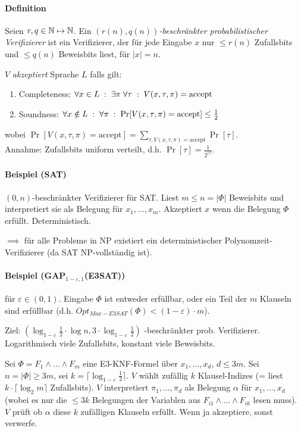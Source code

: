 \paragraph{Definition}
Seien $r, q \in \mathbb{N} \mapsto \mathbb{N}$.
Ein \emph{$(r(n), q(n))$-beschränkter probabilistischer Verifizierer} ist ein Verifizierer,
der für jede Eingabe $x$ nur $\leq r(n)$ Zufallsbits und $\leq q(n)$ Beweisbits liest, für $|x| = n$.

$V$ \emph{akzeptiert} Sprache $L$ falls gilt:
\begin{enumerate}[label=(\roman*)]
    \item Completeness: $ \forall x \in L \; : \; \exists \pi \; \forall \tau \; : \; V(x, \tau, \pi) = \text{accept} $
    \item Soundness: $ \forall x \notin L \; : \; \forall \pi \; : \; \Pr [ V(x, \tau, \pi) = \text{accept} ] \leq \frac{1}{2} $
\end{enumerate}
wobei $ \Pr [ V(x, \tau, \pi) = \text{accept} ] = \sum_{ \tau , V(x, \tau, \pi) = \text{accept} } \Pr [\tau] $.
\\
Annahme: Zufallsbits uniform verteilt, d.h. $\Pr [\tau] = \frac{1}{2^{|\tau|}}$.

\paragraph{Beispiel (SAT)}
$(0,n)$-beschränkter Verifizierer für SAT.
Liest $m \leq n = |\Phi|$ Beweisbits und interpretiert sie als Belegung für $x_1, ..., x_m$.
Akzeptiert $x$ wenn die Belegung $\Phi$ erfüllt. Deterministisch.

$\implies$ für alle Probleme in NP existiert ein deterministischer Polynomzeit-Verifizierer
(da SAT NP-vollständig ist).

\paragraph{Beispiel (GAP$_{1-\varepsilon, 1}$(E3SAT))}
für $\varepsilon \in (0,1)$.
Eingabe $\Phi$ ist entweder erfüllbar, oder ein Teil der $m$ Klauseln sind erfüllbar
(d.h. $ Opt_{Max-E3SAT}(\Phi) < (1-\varepsilon) \cdot m$).

Ziel:
$\left( \log_{1-\varepsilon}\frac{1}{2} \cdot \log n , 3 \cdot \log_{1-\varepsilon}\frac{1}{2} \right)$%
-beschränkter prob. Verifizierer.
Logarithmisch viele Zufallsbits, konstant viele Beweisbits.

Sei $\Phi = F_1 \wedge ... \wedge F_m$ eine E3-KNF-Formel über $x_1, ..., x_d$, $d \leq 3m$.
Sei $n = |\Phi| \geq 3m$, sei $k = \lceil \log_{1-\varepsilon}\frac{1}{2} \rceil$.
$V$ wählt zufällig $k$ Klausel-Indizes (= liest $k \cdot \lceil \log_2 m \rceil$ Zufallsbits).
$V$ interpretiert $\pi_1, ..., \pi_d$ als Belegung $\alpha$ für $x_1, ..., x_d$
(wobei es nur die $\leq 3k$ Belegungen der Variablen aus $F_{i1} \wedge ... \wedge F_{ik}$ lesen muss).
$V$ prüft ob $\alpha$ diese $k$ zufälligen Klauseln erfüllt.
Wenn ja akzeptiere, sonst verwerfe.

